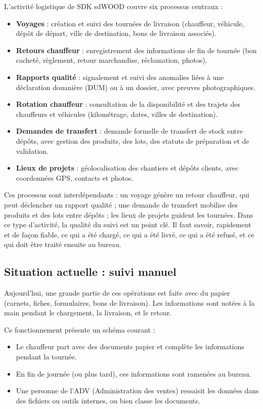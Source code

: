 \documentclass[12pt,a4paper]{article}
\begin{document}
    L'activité logistique de SDK sdWOOD couvre six processus centraux :
    \begin{itemize}[leftmargin=1.2em]
    \item \textbf{Voyages} : création et suivi des tournées de livraison (chauffeur, véhicule, dépôt de départ, ville de destination, bons de livraison associés).
    \item \textbf{Retours chauffeur} : enregistrement des informations de fin de tournée (bon cacheté, règlement, retour marchandise, réclamation, photos).
    \item \textbf{Rapports qualité} : signalement et suivi des anomalies liées à une déclaration douanière (DUM) ou à un dossier, avec preuves photographiques.
    \item \textbf{Rotation chauffeur} : consultation de la disponibilité et des trajets des chauffeurs et véhicules (kilométrage, dates, villes de destination).
    \item \textbf{Demandes de transfert} : demande formelle de transfert de stock entre dépôts, avec gestion des produits, des lots, des statuts de préparation et de validation.
    \item \textbf{Lieux de projets} : géolocalisation des chantiers et dépôts clients, avec coordonnées GPS, contacts et photos.
    \end{itemize}

    Ces processus sont interdépendants : un voyage génère un retour chauffeur, qui peut déclencher un rapport qualité ; une demande de transfert mobilise des produits et des lots entre dépôts ; les lieux de projets guident les tournées. Dans ce type d'activité, la qualité du suivi est un point clé. Il faut savoir, rapidement et de façon fiable, ce qui a été chargé, ce qui a été livré, ce qui a été refusé, et ce qui doit être traité ensuite au bureau.

    \subsection{Situation actuelle : suivi manuel}
    Aujourd'hui, une grande partie de ces opérations est faite avec du papier (carnets, fiches, formulaires, bons de livraison). Les informations sont notées à la main pendant le chargement, la livraison, et le retour.

    Ce fonctionnement présente un schéma courant :
    \begin{itemize}[leftmargin=1.2em]
    \item Le chauffeur part avec des documents papier et complète les informations pendant la tournée.
    \item En fin de journée (ou plus tard), ces informations sont ramenées au bureau.
    \item Une personne de l'ADV (Administration des ventes) ressaisit les données dans des fichiers ou outils internes, ou bien classe les documents.
    \end{itemize}
\end{document}
